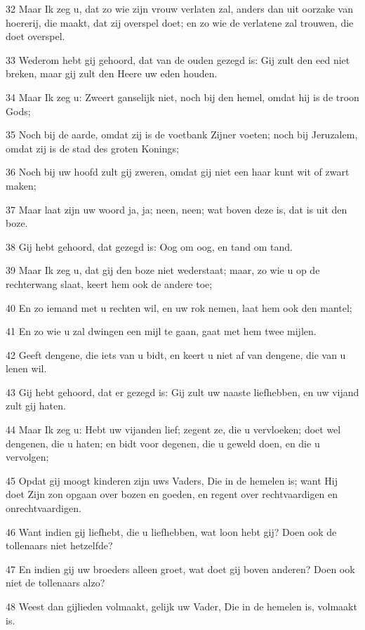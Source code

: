 \par 32 Maar Ik zeg u, dat zo wie zijn vrouw verlaten zal, anders dan uit oorzake van hoererij, die maakt, dat zij overspel doet; en zo wie de verlatene zal trouwen, die doet overspel.
\par 33 Wederom hebt gij gehoord, dat van de ouden gezegd is: Gij zult den eed niet breken, maar gij zult den Heere uw eden houden.
\par 34 Maar Ik zeg u: Zweert ganselijk niet, noch bij den hemel, omdat hij is de troon Gods;
\par 35 Noch bij de aarde, omdat zij is de voetbank Zijner voeten; noch bij Jeruzalem, omdat zij is de stad des groten Konings;
\par 36 Noch bij uw hoofd zult gij zweren, omdat gij niet een haar kunt wit of zwart maken;
\par 37 Maar laat zijn uw woord ja, ja; neen, neen; wat boven deze is, dat is uit den boze.
\par 38 Gij hebt gehoord, dat gezegd is: Oog om oog, en tand om tand.
\par 39 Maar Ik zeg u, dat gij den boze niet wederstaat; maar, zo wie u op de rechterwang slaat, keert hem ook de andere toe;
\par 40 En zo iemand met u rechten wil, en uw rok nemen, laat hem ook den mantel;
\par 41 En zo wie u zal dwingen een mijl te gaan, gaat met hem twee mijlen.
\par 42 Geeft dengene, die iets van u bidt, en keert u niet af van dengene, die van u lenen wil.
\par 43 Gij hebt gehoord, dat er gezegd is: Gij zult uw naaste liefhebben, en uw vijand zult gij haten.
\par 44 Maar Ik zeg u: Hebt uw vijanden lief; zegent ze, die u vervloeken; doet wel dengenen, die u haten; en bidt voor degenen, die u geweld doen, en die u vervolgen;
\par 45 Opdat gij moogt kinderen zijn uws Vaders, Die in de hemelen is; want Hij doet Zijn zon opgaan over bozen en goeden, en regent over rechtvaardigen en onrechtvaardigen.
\par 46 Want indien gij liefhebt, die u liefhebben, wat loon hebt gij? Doen ook de tollenaars niet hetzelfde?
\par 47 En indien gij uw broeders alleen groet, wat doet gij boven anderen? Doen ook niet de tollenaars alzo?
\par 48 Weest dan gijlieden volmaakt, gelijk uw Vader, Die in de hemelen is, volmaakt is.

